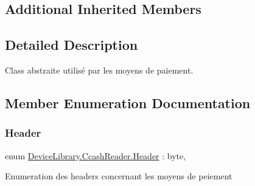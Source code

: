 \subsection*{Additional Inherited Members}


\subsection{Detailed Description}
Class abstraite utilisé par les moyens de paiement. 



\subsection{Member Enumeration Documentation}
\mbox{\label{class_device_library_1_1_ccash_reader_af4bdeeddb7c89dd2b54f86978f5e9866}} 
\subsubsection{\texorpdfstring{Header}{Header}}
{\footnotesize\ttfamily enum \mbox{\hyperlink{class_device_library_1_1_ccash_reader_af4bdeeddb7c89dd2b54f86978f5e9866}{Device\+Library.\+Ccash\+Reader.\+Header}} \+: byte\hspace{0.3cm}{\ttfamily [strong]}, {\ttfamily [protected]}}



Enumeration des headers concernant les moyens de peiement 

